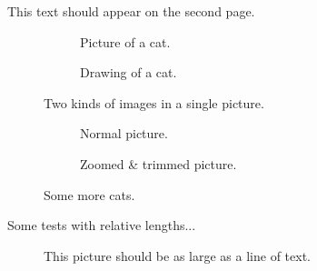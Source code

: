 This text should appear on the second page.

\begin{figure}
    \centering
    \begin{subfigure}[b]{.5\textwidth}
        \centering
        \Large
        \caption{Picture of a cat.}
    \end{subfigure}%
    \begin{subfigure}[b]{.5\textwidth}
        \centering
        \LARGE
        \caption{Drawing of a cat.}
    \end{subfigure}
    \caption{Two kinds of images in a single picture.}
    \label{fig:cats}
\end{figure}

\begin{figure}
    \centering
    \begin{subfigure}[b]{.5\textwidth}
        \centering
        \caption{Normal picture.}
    \end{subfigure}%
    \begin{subfigure}[b]{.5\textwidth}
        \centering
        \caption{Zoomed \& trimmed picture.}
    \end{subfigure}
    \caption{Some more cats.}
    \label{fig:more-cats}
\end{figure}

\newpage
Some tests with relative lengths...

\begin{figure}
    \centering
    \caption{This picture should be as large as a line of text.}
\end{figure}

%
